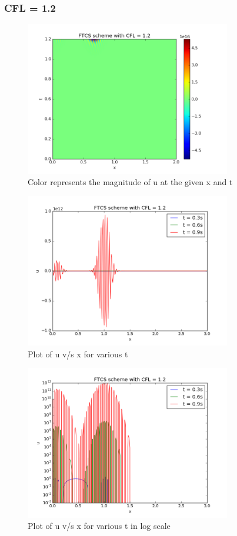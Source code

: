 \documentclass[11pt, a4paper]{article}
\begin{document}
\subsubsection{CFL = 1.2}
\begin{figure}[H]
 \centering
 \includegraphics[width = 0.8\textwidth]{FTCS2_12.png}
 \caption{Color represents the magnitude of u at the given x and t}
\end{figure}

\begin{figure}[H]
 \centering
 \includegraphics[width = 0.8\textwidth]{FTCS2_12_1.png}
 \caption{Plot of u v/s x for various t}
\end{figure}

\begin{figure}[H]
 \centering
 \includegraphics[width = 0.8\textwidth]{FTCS2_12_1_log.png}
 \caption{Plot of u v/s x for various t in log scale}
\end{figure}
\end{document}
